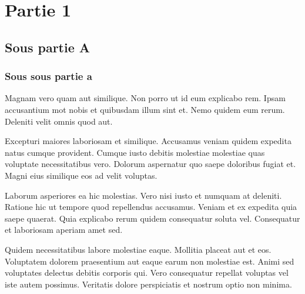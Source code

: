 \section{Partie 1}
\subsection{Sous partie A}
\subsubsection{Sous sous partie a}

Magnam vero quam aut similique. Non porro ut id eum explicabo rem. Ipsam accusantium \gls{mot} nobis et quibusdam illum sint et. Nemo quidem eum rerum. Deleniti velit omnis quod aut.

Excepturi maiores laboriosam et similique. Accusamus veniam quidem expedita natus cumque provident. Cumque iusto debitis molestiae molestiae quas voluptate\cite{smith1920article} necessitatibus vero. Dolorum aspernatur quo saepe doloribus fugiat et. Magni eius similique eos ad velit voluptas.

Laborum asperiores ea hic molestias. Vero nisi iusto et numquam at deleniti. Ratione hic ut tempore quod repellendus accusamus. Veniam et ex expedita quia saepe quaerat. Quia explicabo rerum quidem consequatur soluta vel. Consequatur et laboriosam aperiam amet sed.

Quidem necessitatibus labore molestiae eaque. Mollitia placeat aut et eos. Voluptatem dolorem praesentium aut eaque earum non molestiae est. Animi sed voluptates\cite{gltransform} delectus debitis corporis qui. Vero consequatur repellat voluptas vel iste autem possimus. Veritatis dolore perspiciatis et nostrum optio non minima.


